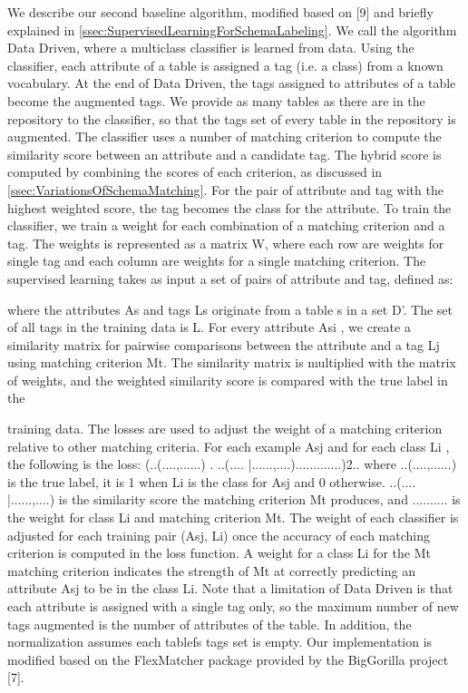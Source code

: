 We describe our second baseline algorithm, modified based on \cite{10.1145/3184558.3191601}[9] and briefly explained in \autoref{ssec:SupervisedLearningForSchemaLabeling}. We call the algorithm Data Driven, where a multiclass classifier is learned from data. Using the classifier, each attribute of a table is assigned a tag (i.e. a class) from a known vocabulary. At the end of Data Driven, the tags assigned to attributes of a table become the augmented tags. We provide as many tables as there are in the repository to the classifier, so that the tags set of every table in the repository is augmented.
The classifier uses a number of matching criterion to compute the similarity score between an attribute and a candidate tag. The hybrid score is computed by combining the scores of each criterion, as discussed in \autoref{ssec:VariationsOfSchemaMatching}. For the pair of attribute and tag with the highest weighted score, the tag becomes the class for the attribute. To train the classifier, we train a weight for each combination of a matching criterion and a tag. The weights is represented as a matrix W, where each row are weights for single tag and each column are weights for a single matching criterion. The supervised learning takes as input a set of pairs of attribute and tag, defined as:

where the attributes As and tags Ls originate from a table s in a set D'. The set of all tags in the training data is L.
For every attribute Asi , we create a similarity matrix for pairwise comparisons between the attribute and a tag Lj using matching criterion Mt. The similarity matrix is multiplied with the matrix of weights, and the weighted similarity score is compared with the true label in the

training data. The losses are used to adjust the weight of a matching criterion relative to other matching criteria. For each example Asj and for each class Li , the following is the loss: (..(....,......) . ..(.... |......,....).............)2..
where ..(....,......) is the true label, it is 1 when Li is the class for Asj and 0 otherwise. ..(.... |......,....) is the similarity score the matching criterion Mt produces, and .......... is the weight for class Li and matching criterion Mt. The weight of each classifier is adjusted for each training pair (Asj, Li) once the accuracy of each matching criterion is computed in the loss function. A weight for a class Li for the Mt matching criterion indicates the strength of Mt at correctly predicting an attribute Asj to be in the class Li.
Note that a limitation of Data Driven is that each attribute is assigned with a single tag only, so the maximum number of new tags augmented is the number of attributes of the table. In addition, the normalization assumes each tablefs tags set is empty. Our implementation is modified based on the FlexMatcher package provided by the BigGorilla project \cite{DBLP:journals/debu/ChenGHTD18}[7].

